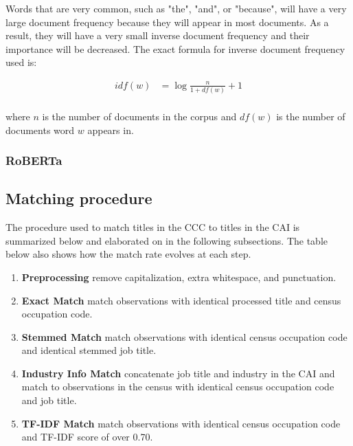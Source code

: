 \documentclass[12pt]{article}
\begin{document}
       Words that are very common, such as "the", "and", or "because", will have a very large document frequency because they will appear in most documents. As a result, they will have a very small inverse document frequency and their importance will be decreased. The exact formula for inverse document frequency used is:

        \begin{align*}
          idf(w) &= \log{\frac{n}{1+df(w)}} +1
        \end{align*}
        \\
      where $n$ is the number of documents in the corpus and $df(w)$ is the number of documents word $w$ appears in.

    \subsubsection{RoBERTa}

  \subsection{Matching procedure}
    The procedure used to match titles in the CCC to titles in the CAI is summarized below and elaborated on in the following subsections. The table below also shows how the match rate evolves at each step.

    \begin{enumerate}
      \item \textbf{Preprocessing} remove capitalization, extra whitespace, and punctuation.
      \item \textbf{Exact Match} match observations with identical processed title and census occupation code.
      \item \textbf{Stemmed Match} match observations with identical census occupation code and identical stemmed job title.
      \item \textbf{Industry Info Match} concatenate job title and industry in the CAI and match to observations in the census with identical census occupation code and job title.
      \item \textbf{TF-IDF Match} match observations with identical census occupation code and TF-IDF score of over 0.70.
    \end{enumerate}
\end{document}
